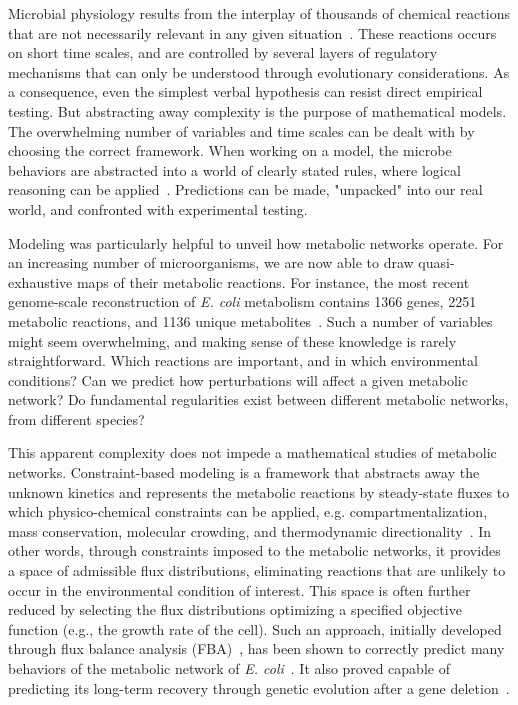 Microbial physiology results from the interplay of thousands of chemical reactions that are not necessarily relevant in any given situation~\cite{schaechter_microbe_2006}.
These reactions occurs on short time scales, and are controlled by several layers of regulatory mechanisms that can only be understood through evolutionary considerations.
As a consequence, even the simplest verbal hypothesis can resist direct empirical testing.
But abstracting away complexity is the purpose of mathematical models.
The overwhelming number of variables and time scales can be dealt with by choosing the correct framework.
When working on a model, the microbe behaviors are abstracted into a world of clearly stated rules, where logical reasoning can be applied~\cite{servedio_not_2014,mcgill_calm_2013}.
Predictions can be made, "unpacked" into our real world, and confronted with experimental testing.

Modeling was particularly helpful to unveil how metabolic networks operate.
For an increasing number of microorganisms, we are now able to draw quasi-exhaustive maps of their metabolic reactions.
For instance, the most recent genome-scale reconstruction of \textit{E. coli} metabolism contains 1366 genes, 2251 metabolic reactions, and 1136 unique metabolites~\cite{orth_comprehensive_2011}.
Such a number of variables might seem overwhelming, and making sense of these knowledge is rarely straightforward.
Which reactions are important, and in which environmental conditions?
Can we predict how perturbations will affect a given metabolic network?
Do fundamental regularities exist between different metabolic networks, from different species?

This apparent complexity does not impede a mathematical studies of metabolic networks.
Constraint-based modeling is a framework that abstracts away the unknown kinetics and represents the metabolic reactions by steady-state fluxes to which physico-chemical constraints can be applied, e.g. compartmentalization, mass conservation, molecular crowding, and thermodynamic directionality~\cite{ebrahim_cobrapy_2013}.
In other words, through constraints imposed to the metabolic networks, it provides a space of admissible flux distributions, eliminating reactions that are unlikely to occur in the environmental condition of interest.
This space is often further reduced by selecting the flux distributions optimizing a specified objective function (e.g., the growth rate of the cell).
Such an approach, initially developed through flux balance analysis (FBA)~\cite{orth_comprehensive_2011,palsson_systems_2011}, has been shown to correctly predict many behaviors of the metabolic network of \textit{E. coli}~\cite{varma_stoichiometric_1994,edwards_silico_2001}.
It also proved capable of predicting its long-term recovery through genetic evolution after a gene deletion~\cite{fong_metabolic_2004}.

